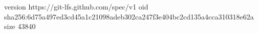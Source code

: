 version https://git-lfs.github.com/spec/v1
oid sha256:6d75a497ed3cd45a1c21098adeb302ca247f3e404bc2cd135a4cca310318e62a
size 43840
